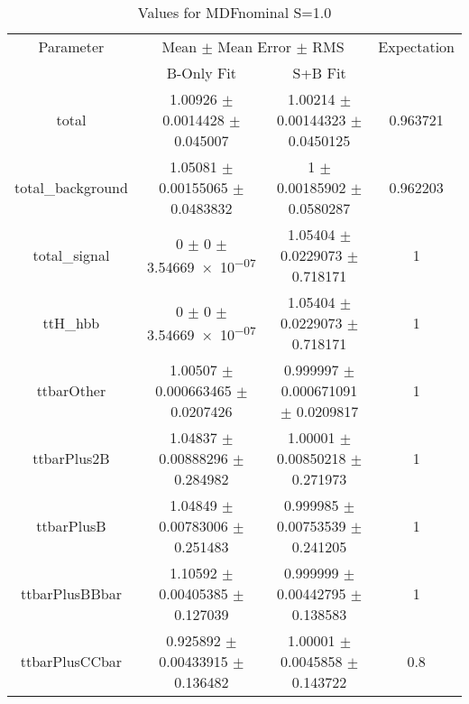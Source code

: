 \begin{table}
\centering
\caption{Values for MDFnominal S=1.0}
\begin{tabular}{cccc}
\toprule
Parameter & \multicolumn{2}{c}{Mean $\pm$ Mean Error $\pm$ RMS} & Expectation\\
 & B-Only Fit & S+B Fit & \\
\midrule
total & \num{1.00926} $\pm$ \num{0.0014428} $\pm$ \num{0.045007} & \num{1.00214} $\pm$ \num{0.00144323} $\pm$ \num{0.0450125} & \num{0.963721}\\
total\_background & \num{1.05081} $\pm$ \num{0.00155065} $\pm$ \num{0.0483832} & \num{1} $\pm$ \num{0.00185902} $\pm$ \num{0.0580287} & \num{0.962203}\\
total\_signal & \num{0} $\pm$ \num{0} $\pm$ \num{3.54669e-07} & \num{1.05404} $\pm$ \num{0.0229073} $\pm$ \num{0.718171} & \num{1}\\
ttH\_hbb & \num{0} $\pm$ \num{0} $\pm$ \num{3.54669e-07} & \num{1.05404} $\pm$ \num{0.0229073} $\pm$ \num{0.718171} & \num{1}\\
ttbarOther & \num{1.00507} $\pm$ \num{0.000663465} $\pm$ \num{0.0207426} & \num{0.999997} $\pm$ \num{0.000671091} $\pm$ \num{0.0209817} & \num{1}\\
ttbarPlus2B & \num{1.04837} $\pm$ \num{0.00888296} $\pm$ \num{0.284982} & \num{1.00001} $\pm$ \num{0.00850218} $\pm$ \num{0.271973} & \num{1}\\
ttbarPlusB & \num{1.04849} $\pm$ \num{0.00783006} $\pm$ \num{0.251483} & \num{0.999985} $\pm$ \num{0.00753539} $\pm$ \num{0.241205} & \num{1}\\
ttbarPlusBBbar & \num{1.10592} $\pm$ \num{0.00405385} $\pm$ \num{0.127039} & \num{0.999999} $\pm$ \num{0.00442795} $\pm$ \num{0.138583} & \num{1}\\
ttbarPlusCCbar & \num{0.925892} $\pm$ \num{0.00433915} $\pm$ \num{0.136482} & \num{1.00001} $\pm$ \num{0.0045858} $\pm$ \num{0.143722} & \num{0.8}\\
\bottomrule
\end{tabular}
\end{table}